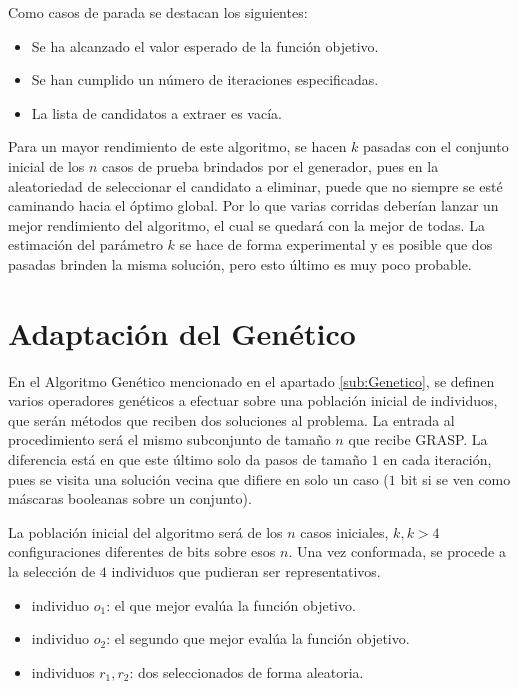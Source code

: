 \documentclass[a4paper,12pt]{book}
\begin{document}
		Como casos de parada se destacan los siguientes:
		
		\begin{itemize}
			\item Se ha alcanzado el valor esperado de la función objetivo.
			\item Se han cumplido un número de iteraciones especificadas.
			\item La lista de candidatos a extraer es vacía.
		\end{itemize}
	
		Para un mayor rendimiento de este algoritmo, se hacen $k$ pasadas con el conjunto inicial de los $n$ casos de prueba brindados por el generador, pues en la aleatoriedad de seleccionar el candidato a eliminar, puede que no siempre se esté caminando hacia el óptimo global. Por lo que varias corridas deberían lanzar un mejor rendimiento del algoritmo, el cual se quedará con la mejor de todas. La estimación del parámetro $k$ se hace de forma experimental y es posible que dos pasadas brinden la misma solución, pero esto último es muy poco probable.
		
	\section{Adaptación del Genético}
		En el Algoritmo Genético mencionado en el apartado \ref{sub:Genetico}, se definen varios operadores genéticos a efectuar sobre una población inicial de individuos, que serán métodos que reciben dos soluciones al problema. La entrada al procedimiento será el mismo subconjunto de tamaño $n$ que recibe GRASP. La diferencia está en que este último solo da pasos de tamaño $1$ en cada iteración, pues se visita una solución vecina que difiere en solo un caso ($1$ bit si se ven como máscaras booleanas sobre un conjunto).
		
		La población inicial del algoritmo será de los $n$ casos iniciales, $k, k > 4$ configuraciones diferentes de bits sobre esos $n$. Una vez conformada, se procede a la selección de $4$ individuos que pudieran ser representativos.
		
		\begin{itemize}
			\item individuo $o_1$: el que mejor evalúa la función objetivo.
			\item individuo $o_2$: el segundo que mejor evalúa la función objetivo.
			\item individuos $r_1, r_2$: dos seleccionados de forma aleatoria.
		\end{itemize} 
	
\end{document}
